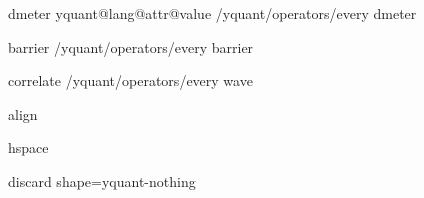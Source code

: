 \yquant@langhelper@declare@command@uncontrolled%
   {dmeter}%
   \yquant@register@get@allowmultitrue%
   {%
      \ifdefined\yquant@lang@attr@type%
         \yquant@register@type@fromstring\yquant@lang@attr@type\yquant@circuit@settype@to%
      \else%
         \let\yquant@circuit@settype@to=\yquant@register@types@cbit%
      \fi%
      \let\yquant@prepare@callback@prepare=\yquant@circuit@settype@prepare%
      \let\yquant@prepare@callback@draw=\yquant@circuit@settype%
      \unless\ifcsname yquant@lang@attr@value\endcsname%
         \let\yquant@lang@attr@value=\empty%
      \fi%
      \expandafter\yquant@prepare%
         \expandafter{\yquant@lang@attr@value}%
         {/yquant/operators/every dmeter}%
   }

\yquant@langhelper@declare@command@uncontrolled%
   {barrier}%
   \yquant@register@get@allowmultitrue%
   {%
      \yquant@prepare%
         {}%
         {/yquant/operators/every barrier}%
   }%

\yquant@langhelper@declare@command@uncontrolled%
   {correlate}%
   {%
      \yquant@register@get@allowmultitrue%
      \let\yquant@register@multi@splitparts=\yquant@register@multi@splitparts@sepall%
   }{%
      \yquant@prepare%
         {}%
         {/yquant/operators/every wave}%
   }

\yquant@langhelper@declare@command@uncontrolled%
   {align}%
   {}%
   {%
      \yquant@circuit@align\yquant@circuit@operator@targets%
   }

\yquant@langhelper@declare@command@uncontrolled%
   {hspace}%
   {%
      \yquant@langhelper@validate\amount\dimen\yquant@lang@attr@value%
   }{%
      \yquant@circuit@hspace\yquant@circuit@operator@targets\amount%
   }

\yquant@langhelper@declare@command%
   {discard}%
   {}%
   {%
      \let\yquant@circuit@settype@to=\yquant@register@types@nobit%
      \ifyquant@circuit@operator@hasControls%
         \epreto{}%
         \let\yquant@prepare@callback@prepare=\yquant@circuit@settype@prepare%
         \let\yquant@prepare@callback@draw=\yquant@circuit@settype@beforenobit%
         \yquant@prepare%
            {}%
            {shape=yquant-nothing}%
      \else%
         \yquant@circuit@actonwires%
            \yquant@circuit@settype@prepare%
            \yquant@circuit@settype%
            \yquant@circuit@operator@targets%
            {}%
      \fi%
   }

